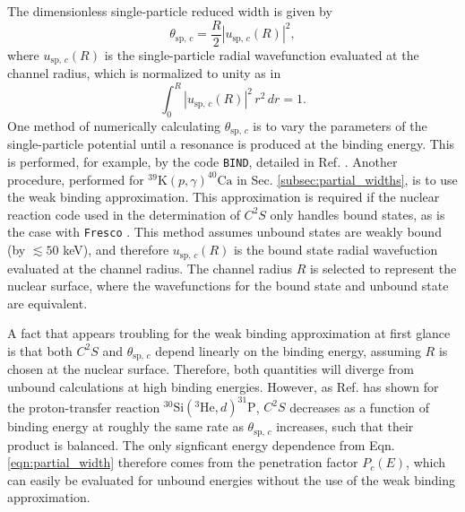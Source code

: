 The dimensionless single-particle reduced width is given by
\begin{equation}
\theta_{\mathrm{sp}, \, c} = \frac{R}{2} | u_{\mathrm{sp}, \, c}(R) |^{2},
\end{equation}
where $u_{\mathrm{sp}, \, c}(R)$ is the single-particle radial wavefunction evaluated at the channel radius, which is normalized to unity as in
\begin{equation}
\int_{0}^{R} |u_{\mathrm{sp}, \, c}(R)|^{2} \, r^{2} \, dr = 1.
\end{equation}
One method of numerically calculating $\theta_{\mathrm{sp}, \, c}$ is to vary the parameters of the single-particle potential until a resonance is produced at the binding energy. This is performed, for example, by the code \texttt{BIND}, detailed in Ref. \cite{Iliadis1997}. Another procedure, performed for $^{39}\mathrm{K}(p, \gamma)^{40}\mathrm{Ca}$ in Sec. \ref{subsec:partial_widths}, is to use the weak binding approximation. This approximation is required if the nuclear reaction code used in the determination of $C^{2}S$ only handles bound states, as is the case with \texttt{Fresco} \cite{Thompson1988,Fresco}. This method assumes unbound states are weakly bound (by $\lesssim 50$ keV), and therefore $u_{\mathrm{sp}, \, c}(R)$ is the bound state radial wavefuction evaluated at the channel radius. The channel radius $R$ is selected to represent the nuclear surface, where the wavefunctions for the bound state and unbound state are equivalent.

A fact that appears troubling for the weak binding approximation at first glance is that both $C^{2}S$ and $\theta_{\mathrm{sp}, \, c}$ depend linearly on the binding energy, assuming $R$ is chosen at the nuclear surface. Therefore, both quantities will diverge from unbound calculations at high binding energies. However, as Ref. \cite{Harrouz2023} has shown for the proton-transfer reaction $^{30}\mathrm{Si}(^{3}\mathrm{He},d)^{31}\mathrm{P}$, $C^{2}S$ decreases as a function of binding energy at roughly the same rate as $\theta_{\mathrm{sp}, \, c}$ increases, such that their product is balanced. The only signficant energy dependence from Eqn. \ref{eqn:partial_width} therefore comes from the penetration factor $P_{c}(E)$, which can easily be evaluated for unbound energies without the use of the weak binding approximation.

